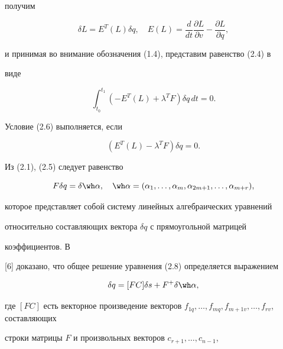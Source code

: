 получим


$$ 


\delta L=E^T(L)\delta q,\quad E(L)=\frac{d}{d t} 


\frac{\partial L}{\partial v}-\frac{\partial L}{\partial q},


$$ 


и принимая во внимание обозначения (1.4), представим равенство (2.4) в 


виде 


\begin{equation} 


\int^{t_1}_{t_0}(-E^T(L)+\lambda^T F)\delta q\,d t=0. 


\end{equation} 


 


Условие (2.6) выполняется, если 


\begin{equation} 


(E^T(L)-\lambda^T F)\delta q=0. 


\end{equation} 


Из (2.1), (2.5) следует равенство 


\begin{equation} 


F\delta q=\delta\wh\alpha,\quad \wh\alpha= 


(\alpha_1,\dotsc,\alpha_m,\alpha_{2m+1},\dotsc,\alpha_{m+r}), 


\end{equation} 


которое представляет собой систему линейных алгебраических уравнений 


относительно составляющих вектора $\delta q$ с прямоугольной матрицей 


коэффициентов. В 


[6] доказано, что общее решение уравнения (2.8) определяется выражением 


\begin{equation} 


\delta q=[FC]\delta s+F^+\delta\wh\alpha, 


\end{equation} 


где $[FC]$ есть векторное произведение векторов $f_{1q},\dotsc,f_{m 


q},f_{m+1v},\dotsc,f_{r v}$, составляющих 


строки матрицы $F$ и произвольных векторов $c_{r+1},\dotsc,c_{n-1}$, 


